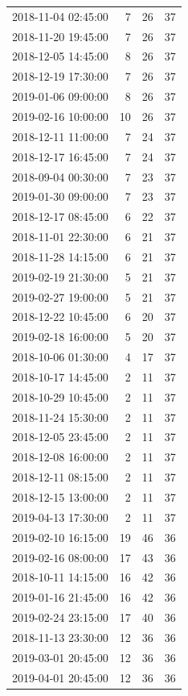\begin{tabular}{lrrr}
2018-11-04 02:45:00 & 7 & 26 & 37 \\
2018-11-20 19:45:00 & 7 & 26 & 37 \\
2018-12-05 14:45:00 & 8 & 26 & 37 \\
2018-12-19 17:30:00 & 7 & 26 & 37 \\
2019-01-06 09:00:00 & 8 & 26 & 37 \\
2019-02-16 10:00:00 & 10 & 26 & 37 \\
2018-12-11 11:00:00 & 7 & 24 & 37 \\
2018-12-17 16:45:00 & 7 & 24 & 37 \\
2018-09-04 00:30:00 & 7 & 23 & 37 \\
2019-01-30 09:00:00 & 7 & 23 & 37 \\
2018-12-17 08:45:00 & 6 & 22 & 37 \\
2018-11-01 22:30:00 & 6 & 21 & 37 \\
2018-11-28 14:15:00 & 6 & 21 & 37 \\
2019-02-19 21:30:00 & 5 & 21 & 37 \\
2019-02-27 19:00:00 & 5 & 21 & 37 \\
2018-12-22 10:45:00 & 6 & 20 & 37 \\
2019-02-18 16:00:00 & 5 & 20 & 37 \\
2018-10-06 01:30:00 & 4 & 17 & 37 \\
2018-10-17 14:45:00 & 2 & 11 & 37 \\
2018-10-29 10:45:00 & 2 & 11 & 37 \\
2018-11-24 15:30:00 & 2 & 11 & 37 \\
2018-12-05 23:45:00 & 2 & 11 & 37 \\
2018-12-08 16:00:00 & 2 & 11 & 37 \\
2018-12-11 08:15:00 & 2 & 11 & 37 \\
2018-12-15 13:00:00 & 2 & 11 & 37 \\
2019-04-13 17:30:00 & 2 & 11 & 37 \\
2019-02-10 16:15:00 & 19 & 46 & 36 \\
2019-02-16 08:00:00 & 17 & 43 & 36 \\
2018-10-11 14:15:00 & 16 & 42 & 36 \\
2019-01-16 21:45:00 & 16 & 42 & 36 \\
2019-02-24 23:15:00 & 17 & 40 & 36 \\
2018-11-13 23:30:00 & 12 & 36 & 36 \\
2019-03-01 20:45:00 & 12 & 36 & 36 \\
2019-04-01 20:45:00 & 12 & 36 & 36 \\

\end{tabular}
